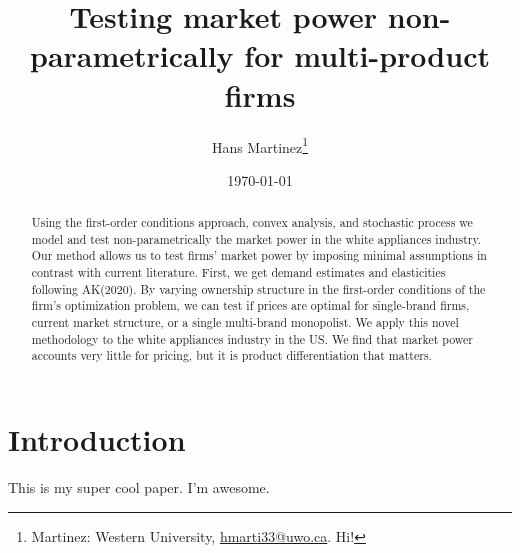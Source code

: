 \documentclass[AER]{AEA}
\begin{document}
\title{Testing market power non-parametrically for multi-product firms}



\author{
  Hans Martinez\thanks{
  Martinez: Western
University, \href{mailto:hmarti33@uwo.ca}{hmarti33@uwo.ca}.
  Hi!
}
}

\date{\today}

\begin{abstract}
Using the first-order conditions approach, convex analysis, and
stochastic process we model and test non-parametrically the market power
in the white appliances industry. Our method allows us to test firms'
market power by imposing minimal assumptions in contrast with current
literature. First, we get demand estimates and elasticities following
AK(2020). By varying ownership structure in the first-order conditions
of the firm's optimization problem, we can test if prices are optimal
for single-brand firms, current market structure, or a single
multi-brand monopolist. We apply this novel methodology to the white
appliances industry in the US. We find that market power accounts very
little for pricing, but it is product differentiation that matters.
\end{abstract}


\maketitle

\hypertarget{introduction}{%
\section*{Introduction}\label{introduction}}

This is my super cool paper. I'm awesome.
\end{document}
